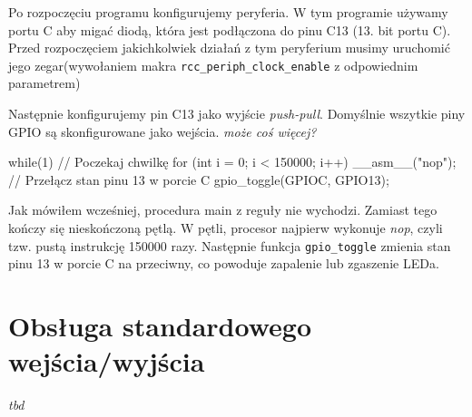 \documentclass{pdfBooklets}
\begin{document}
Po rozpoczęciu programu konfigurujemy peryferia. W tym programie używamy portu C aby migać diodą, która jest podłączona do pinu C13
(13. bit portu C). Przed rozpoczęciem jakichkolwiek działań z tym peryferium musimy uruchomić jego zegar\footnotemark (wywołaniem makra
\Verb$rcc_periph_clock_enable$ z odpowiednim parametrem)

Następnie konfigurujemy pin C13 jako wyjście \textit{push-pull}. Domyślnie wszytkie piny GPIO są skonfigurowane jako wejścia.
\textit{może coś więcej?}


\begin{CodeFrame*}[c]{}
  while(1){
    // Poczekaj chwilkę
    for (int i = 0; i < 150000; i++) __asm__("nop");
    // Przełącz stan pinu 13 w porcie C
    gpio_toggle(GPIOC, GPIO13); 
  }
\end{CodeFrame*}

Jak mówiłem wcześniej, procedura main z reguły nie wychodzi. Zamiast tego kończy się nieskończoną pętlą. W pętli, procesor najpierw
wykonuje \textit{nop}, czyli tzw. pustą instrukcję 150000 razy\footnotemark. Następnie funkcja \Verb$gpio_toggle$ zmienia stan pinu 13
w porcie C na przeciwny, co powoduje zapalenie lub zgaszenie LEDa.



\section{Obsługa standardowego wejścia/wyjścia}


\textit{tbd}
\end{document}
